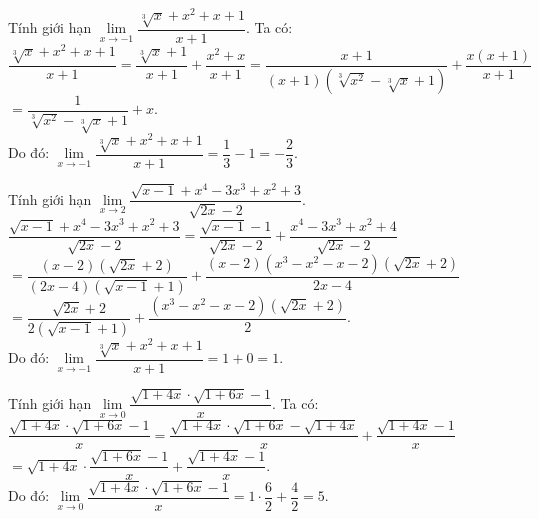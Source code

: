 \begin{bt}%
Tính giới hạn $\lim\limits_{x \to -1}\dfrac{\sqrt[3]{x} + x^2 + x + 1}{x + 1}$.
\loigiai
{
Ta có:\\
$\dfrac{\sqrt[3]{x} + x^2 + x + 1}{x + 1} = \dfrac{\sqrt[3]{x} + 1}{x + 1} + \dfrac{x^2 + x}{x + 1} = \dfrac{x + 1}{(x + 1)\left(\sqrt[3]{x^2} - \sqrt[3]{x} + 1\right)} + \dfrac{x(x+1)}{x+1}$\\
$= \dfrac{1}{\sqrt[3]{x^2} - \sqrt[3]{x} + 1} + x$.\\
Do đó: $\lim\limits_{x \to -1}\dfrac{\sqrt[3]{x} + x^2 + x + 1}{x + 1} = \dfrac{1}{3} - 1 = -\dfrac{2}{3}$.
}
\end{bt}


\begin{bt}%
Tính giới hạn $\lim\limits_{x \to 2}\dfrac{\sqrt{x-1}+x^4 - 3x^3 + x^2 + 3}{\sqrt{2x} - 2}$.
\loigiai
{
$\dfrac{\sqrt{x-1}+x^4 - 3x^3 + x^2 + 3}{\sqrt{2x} - 2} = \dfrac{\sqrt{x-1} - 1}{\sqrt{2x} - 2} + \dfrac{x^4-3x^3+x^2 +4}{\sqrt{2x}-2} $\\
$= \dfrac{(x-2)\left(\sqrt{2x}+2\right)}{(2x-4)(\sqrt{x-1}+1)} + \dfrac{(x-2)(x^3-x^2-x-2)\left(\sqrt{2x}+2\right)}{2x-4}$\\
$= \dfrac{\sqrt{2x}+2}{2(\sqrt{x-1}+1)} + \dfrac{(x^3-x^2-x-2)\left(\sqrt{2x}+2\right)}{2}$.\\
Do đó: $\lim\limits_{x \to -1}\dfrac{\sqrt[3]{x} + x^2 + x + 1}{x + 1} = 1 + 0 = 1$.
}
\end{bt}


\begin{bt}%
Tính giới hạn $\lim\limits_{x \to 0}\dfrac{\sqrt{1+4x} \cdot \sqrt{1 + 6x} - 1}{x}$.
\loigiai
{
Ta có:\\
$\dfrac{\sqrt{1+4x} \cdot \sqrt{1 + 6x} - 1}{x} = \dfrac{\sqrt{1+4x} \cdot \sqrt{1+6x} - \sqrt{1+4x}}{x} + \dfrac{\sqrt{1+4x}-1}{x}$\\
$= \sqrt{1+4x} \cdot \dfrac{\sqrt{1+6x} - 1}{x} + \dfrac{\sqrt{1+4x} - 1}{x}$.\\
Do đó: $\lim\limits_{x \to 0}\dfrac{\sqrt{1+4x} \cdot \sqrt{1 + 6x} - 1}{x} = 1 \cdot \dfrac{6}{2} + \dfrac{4}{2} = 5$.
}
\end{bt}


